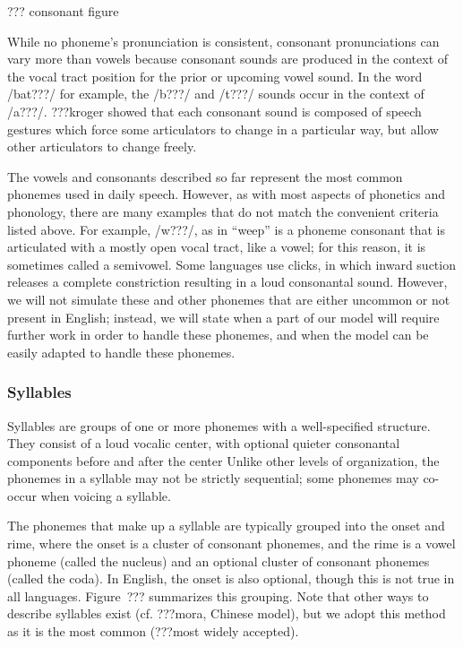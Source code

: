 ??? consonant figure

While no phoneme's pronunciation is consistent,
consonant pronunciations can vary more than vowels
because consonant sounds are produced in the context
of the vocal tract position for
the prior or upcoming vowel sound.
In the word /bat???/ for example,
the /b???/ and /t???/ sounds
occur in the context of /a???/.
???kroger showed that
each consonant sound is composed
of speech gestures which force some
articulators to change in a particular way,
but allow other articulators
to change freely.

The vowels and consonants described so far
represent the most common phonemes used
in daily speech.
However, as with most aspects
of phonetics and phonology,
there are many examples that do not
match the convenient criteria listed above.
For example, /w???/, as in ``weep''
is a phoneme consonant that is articulated
with a mostly open vocal tract,
like a vowel;
for this reason, it is sometimes called a semivowel.
Some languages use clicks,
in which inward suction releases a complete constriction
resulting in a loud consonantal sound.
However, we will not simulate
these and other phonemes
that are either uncommon or not present in English;
instead, we will state when a part of our model
will require further work
in order to handle these phonemes,
and when the model can be easily
adapted to handle these phonemes.

\subsubsection{Syllables}

Syllables are groups of one or more phonemes
with a well-specified structure.
They consist of a loud vocalic center,
with optional quieter consonantal components
before and after the center
Unlike other levels of organization,
the phonemes in a syllable
may not be strictly sequential;
some phonemes may co-occur
when voicing a syllable.

The phonemes that make up a syllable
are typically grouped into
the onset and rime,
where the onset is a cluster of
consonant phonemes,
and the rime is a vowel phoneme
(called the nucleus)
and an optional cluster of consonant
phonemes (called the coda).
In English, the onset is also optional,
though this is not true in all languages.
Figure~??? summarizes this grouping.
Note that other ways to describe
syllables exist
(cf. ???mora, Chinese model),
but we adopt this method
as it is the most common
(???most widely accepted).

